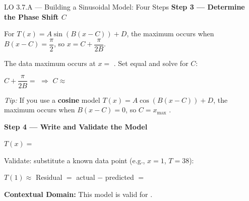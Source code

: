 \documentclass[10pt]{article}
\begin{document}
\begin{notesbox}{LO 3.7.A --- Building a Sinusoidal Model: Four Steps}
\vspace{10pt}
\textbf{Step 3 --- Determine the Phase Shift $C$}

For $T(x) = A\sin(B(x - C)) + D$, the maximum occurs when $B(x - C) = \dfrac{\pi}{2}$,
so $x = C + \dfrac{\pi}{2B}$.

The data maximum occurs at $x = $ \underline{\hspace{1.2cm}}. Set equal and solve for $C$:

\vspace{4pt}
$C + \dfrac{\pi}{2B} = $ \underline{\hspace{1.5cm}} \quad $\Rightarrow$ \quad $C \approx$ \underline{\hspace{2cm}}

\vspace{6pt}
\textit{Tip:} If you use a \textbf{cosine} model $T(x) = A\cos(B(x-C)) + D$, the maximum
occurs when $B(x - C) = 0$, so $C = x_{\max}$ \underline{\hspace{3cm}}.

\vspace{10pt}
\textbf{Step 4 --- Write and Validate the Model}

$T(x) = $ \underline{\hspace{6cm}}

\vspace{6pt}
Validate: substitute a known data point (e.g., $x = 1$, $T = 38$):

$T(1) \approx$ \underline{\hspace{3cm}} \quad Residual $= $ actual $-$ predicted $=$ \underline{\hspace{2cm}}

\vspace{6pt}
\textbf{Contextual Domain:} This model is valid for \underline{\hspace{5cm}}.

\end{notesbox}

\vspace{0.08in}
\end{document}
